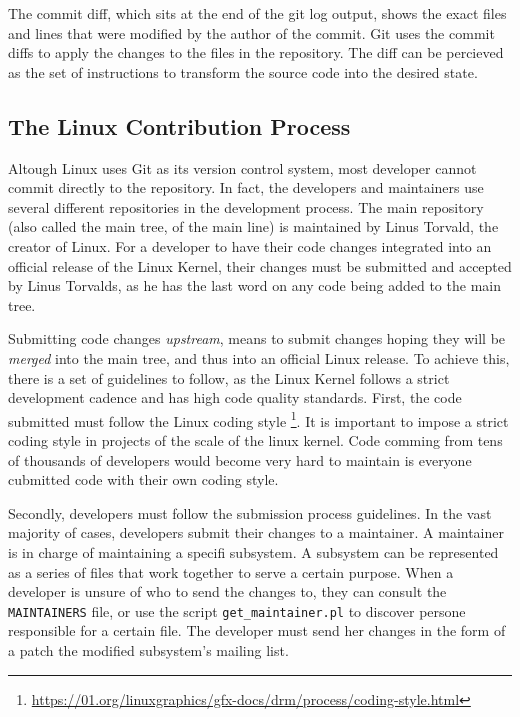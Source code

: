 The commit diff, which sits at the end of the git log output, shows the exact files and lines that were modified by the author of the commit. Git uses the commit diffs to apply the changes to the files in the repository. The diff can be percieved as the set of instructions to transform the source code into the desired state.




\subsection{The Linux Contribution Process}
\label{sec:contrib-process}  


Altough Linux uses Git as its version control system, most developer cannot commit directly to the repository. In fact, the developers and maintainers use several different repositories in the development process. The main repository (also called the main tree, of the main line) is maintained by Linus Torvald, the creator of Linux. For a developer to have their code changes integrated into an official release of the Linux Kernel, their changes must be submitted and accepted by Linus Torvalds, as he has the last word on any code being added to the main tree. 

Submitting code changes \textit{upstream}, means to submit changes hoping they will be \textit{merged} into the main tree, and thus into an official Linux release. To achieve this, there is a set of guidelines to follow, as the Linux Kernel follows a strict development cadence and has high code quality standards. First, the code submitted must follow the Linux coding style \footnote{\url{https://01.org/linuxgraphics/gfx-docs/drm/process/coding-style.html}}. It is important to impose a strict coding style in projects of the scale of the linux kernel. Code comming from tens of thousands of developers would become very hard to maintain is everyone cubmitted code with their own coding style. 

Secondly, developers must follow the submission process guidelines. In the vast majority of cases, developers submit their changes to a maintainer. A maintainer is in charge of maintaining a specifi subsystem. A subsystem can be represented as a series of files that work together to serve a certain purpose. When a developer is unsure of who to send the changes to, they can consult the \texttt{MAINTAINERS} file, or use the script \texttt{get\_maintainer.pl} to discover persone responsible for a certain file. The developer must send her changes in the form of a patch the modified subsystem's mailing list. 

